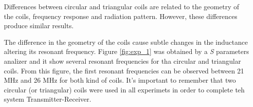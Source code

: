 \documentclass[a4paper,10pt]{article}
\begin{document}
Differences between circular and triangular coils are related to the geometry of the coils, frequency response and radiation pattern. However, these differences produce similar results.

The difference in the geometry of the coils cause subtle changes in the inductance altering its resonant frequency. Figure \ref{fig:exp_1} was obtained by a \emph{S} parameters analizer and it show several resonant frequencies for tha circular and triangular coils. From this figure, the first resonant frequencies can be observed between 21 MHz and 26 MHz for both kind of coils. It's important to remember that two circular (or triangular) coils were used in all experimets in order to complete teh system Transmitter-Receiver.

\begin{figure}[tbp]
\begin{center}
\end{center}
\end{figure}
\end{document}
